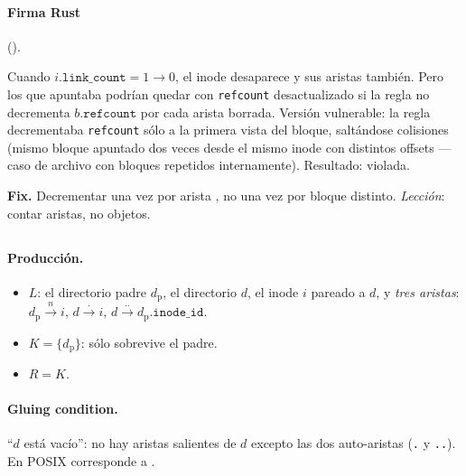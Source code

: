 \paragraph{Firma Rust} ().

\begin{trampa}
\label{tr:orphan-blocks}
Cuando $i.\texttt{link\_count} = 1 \to 0$, el inode desaparece y sus
aristas \epointsto{} también. Pero los \NBlk{} que apuntaba podrían
quedar con \texttt{refcount} desactualizado si la regla no decrementa
$b.\texttt{refcount}$ por cada arista borrada. Versión vulnerable: la
regla decrementaba \texttt{refcount} sólo a la primera vista del bloque,
saltándose colisiones (mismo bloque apuntado dos veces desde el mismo
inode con distintos offsets — caso de archivo con bloques repetidos
internamente). Resultado:  violada.

\textbf{Fix.} Decrementar una vez por arista \epointsto, no una vez por
bloque distinto. \emph{Lección}: contar aristas, no objetos.
\end{trampa}

\subsection{\oprmdir}

\paragraph{Producción.}

\begin{itemize}
  \item $L$: el directorio padre $d_{\text{p}}$, el directorio $d$, el
    inode $i$ pareado a $d$, y \emph{tres aristas}: $d_{\text{p}}
    \xrightarrow{n} i$, $d \xrightarrow{\,.\,} i$, $d \xrightarrow{\,..\,}
    d_{\text{p}}.\texttt{inode\_id}$.
  \item $K = \{d_{\text{p}}\}$: sólo sobrevive el padre.
  \item $R = K$.
\end{itemize}

\paragraph{Gluing condition.} ``$d$ está vacío'': no hay aristas
\econtains{} salientes de $d$ excepto las dos auto-aristas (\texttt{.}
y \texttt{..}). En POSIX corresponde a \enotempty.

